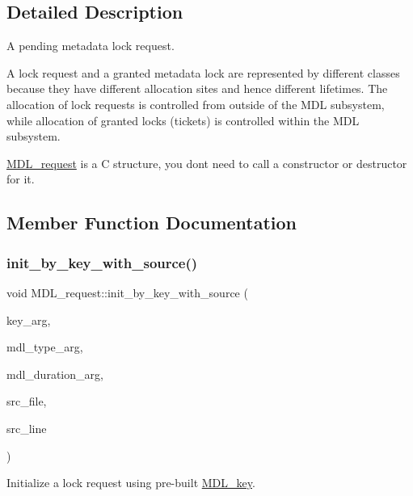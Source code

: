 \subsection{Detailed Description}
A pending metadata lock request.

A lock request and a granted metadata lock are represented by different classes because they have different allocation sites and hence different lifetimes. The allocation of lock requests is controlled from outside of the M\+DL subsystem, while allocation of granted locks (tickets) is controlled within the M\+DL subsystem.

\mbox{\hyperlink{classMDL__request}{M\+D\+L\+\_\+request}} is a C structure, you don\textquotesingle{}t need to call a constructor or destructor for it. 

\subsection{Member Function Documentation}
\mbox{\label{classMDL__request_a4e16a57d0955ac62887ff87d46dee5ad}} 
\subsubsection{\texorpdfstring{init\+\_\+by\+\_\+key\+\_\+with\+\_\+source()}{init\_by\_key\_with\_source()}}
{\footnotesize\ttfamily void M\+D\+L\+\_\+request\+::init\+\_\+by\+\_\+key\+\_\+with\+\_\+source (\begin{DoxyParamCaption}\item[{const \mbox{\hyperlink{structMDL__key}{M\+D\+L\+\_\+key}} $\ast$}]{key\+\_\+arg,  }\item[{enum\+\_\+mdl\+\_\+type}]{mdl\+\_\+type\+\_\+arg,  }\item[{enum\+\_\+mdl\+\_\+duration}]{mdl\+\_\+duration\+\_\+arg,  }\item[{const char $\ast$}]{src\+\_\+file,  }\item[{uint}]{src\+\_\+line }\end{DoxyParamCaption})}

Initialize a lock request using pre-\/built \mbox{\hyperlink{structMDL__key}{M\+D\+L\+\_\+key}}.

